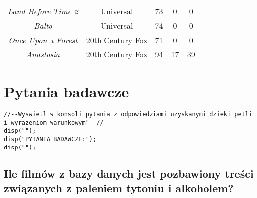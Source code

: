 \documentclass[a4paper, 11pt]{article}
\begin{document}
\begin{table}[H]
\begin{tabular}{|ccccc|}
\textit{Land Before Time 2}                                                     & Universal                             & 73                                                                                    & 0                                                                                             & 0                                                                        \\
\textit{Balto}                                                                  & Universal                             & 74                                                                                    & 0                                                                                             & 0                                                                        \\
\textit{Once Upon a Forest}                                                     & 20th Century Fox                      & 71                                                                                    & 0                                                                                             & 0                                                                        \\
\textit{Anastasia}                                                              & 20th Century Fox                      & 94                                                                                    & 17                                                                                            & 39                                                                       \\ \hline
\end{tabular}
\end{table}
\newpage 

\section{Pytania badawcze}
\begin{lstlisting}
//--Wyswietl w konsoli pytania z odpowiedziami uzyskanymi dzieki petli i wyrazeniom warunkowym"--//
disp("");
disp("PYTANIA BADAWCZE:");
disp("");
\end{lstlisting}

\subsection{Ile filmów z bazy danych jest pozbawiony treści związanych z paleniem 
       tytoniu i alkoholem?  }
       
\end{document}
